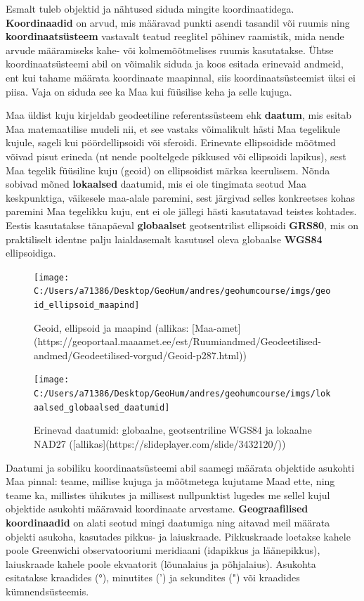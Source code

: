 \documentclass[
]{book}
\begin{document}
Esmalt tuleb objektid ja nähtused siduda mingite koordinaatidega. \textbf{Koordinaadid} on arvud, mis määravad punkti asendi tasandil või ruumis ning \textbf{koordinaatsüsteem} vastavalt teatud reeglitel põhinev raamistik, mida nende arvude määramiseks kahe- või kolmemõõtmelises ruumis kasutatakse. Ühtse koordinaatsüsteemi abil on võimalik siduda ja koos esitada erinevaid andmeid, ent kui tahame määrata koordinaate maapinnal, siis koordinaatsüsteemist üksi ei piisa. Vaja on siduda see ka Maa kui füüsilise keha ja selle kujuga.

Maa üldist kuju kirjeldab geodeetiline referentssüsteem ehk \textbf{daatum}, mis esitab Maa matemaatilise mudeli nii, et see vastaks võimalikult hästi Maa tegelikule kujule, sageli kui pöördellipsoidi või sferoidi. Erinevate ellipsoidide mõõtmed võivad pisut erineda (nt nende pooltelgede pikkused või ellipsoidi lapikus), sest Maa tegelik füüsiline kuju (geoid) on ellipsoidist märksa keerulisem. Nõnda sobivad mõned \textbf{lokaalsed} daatumid, mis ei ole tingimata seotud Maa keskpunktiga, väikesele maa-alale paremini, sest järgivad selles konkreetses kohas paremini Maa tegelikku kuju, ent ei ole jällegi hästi kasutatavad teistes kohtades.
Eestis kasutatakse tänapäeval \textbf{globaalset} geotsentrilist ellipsoidi \textbf{GRS80}, mis on praktiliselt identne palju laialdasemalt kasutusel oleva globaalse \textbf{WGS84} ellipsoidiga.

\begin{figure}

{\centering \texttt{[image: C:/Users/a71386/Desktop/GeoHum/andres/geohumcourse/imgs/geoid\_ellipsoid\_maapind]} 

}

\caption{Geoid, ellipsoid ja maapind (allikas: [Maa-amet](https://geoportaal.maaamet.ee/est/Ruumiandmed/Geodeetilised-andmed/Geodeetilised-vorgud/Geoid-p287.html))}\label{fig:geoid-ellipsoid}
\end{figure}

\begin{figure}

{\centering \texttt{[image: C:/Users/a71386/Desktop/GeoHum/andres/geohumcourse/imgs/lokaalsed\_globaalsed\_daatumid]} 

}

\caption{Erinevad daatumid: globaalne, geotsentriline WGS84 ja lokaalne NAD27 ([allikas](https://slideplayer.com/slide/3432120/))}\label{fig:daatumid}
\end{figure}

Daatumi ja sobiliku koordinaatsüsteemi abil saamegi määrata objektide asukohti Maa pinnal: teame, millise kujuga ja mõõtmetega kujutame Maad ette, ning teame ka, millistes ühikutes ja millisest nullpunktist lugedes me sellel kujul objektide asukohti määravaid koordinaate arvestame. \textbf{Geograafilised koordinaadid} on alati seotud mingi daatumiga ning aitavad meil määrata objekti asukoha, kasutades pikkus- ja laiuskraade. Pikkuskraade loetakse kahele poole Greenwichi observatooriumi meridiaani (idapikkus ja läänepikkus), laiuskraade kahele poole ekvaatorit (lõunalaius ja põhjalaius). Asukohta esitatakse kraadides (°), minutites (') ja sekundites (") või kraadides kümnendsüsteemis.
\end{document}
